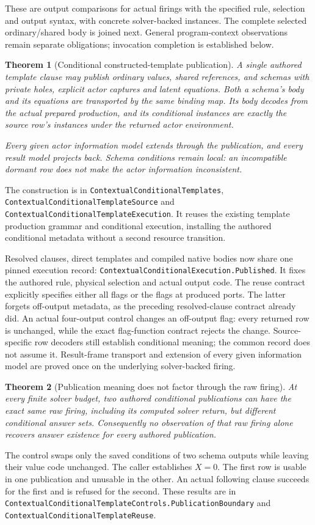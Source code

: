 \documentclass[11pt]{article}
\newtheorem{theorem}{Theorem}
\newcommand{\code}[1]{\texttt{\small #1}}
\begin{document}
These are output comparisons for actual firings with the specified rule,
selection and output syntax, with concrete solver-backed instances.
The complete selected ordinary/shared body is joined next. General
program-context observations remain separate obligations; invocation
completion is established below.

\begin{theorem}[Conditional constructed-template publication]
A single authored template clause may publish ordinary values, shared
references, and schemas with private holes, explicit actor captures and
latent equations. Both a schema's body and its equations are transported
by the same binding map. Its body decodes from the actual prepared
production, and its conditional instances are exactly the source row's
instances under the returned actor environment.

Every given actor information model extends through the publication, and
every result model projects back. Schema conditions remain local: an
incompatible dormant row does not make the actor information inconsistent.
\end{theorem}
The construction is in \code{ContextualConditionalTemplates},
\code{ContextualConditionalTemplateSource} and
\code{ContextualConditionalTemplateExecution}. It reuses the existing
template production grammar and conditional execution, installing the
authored conditional metadata without a second resource transition.

Resolved clauses, direct templates and compiled native bodies now share
one pinned execution record:
\code{ContextualConditionalExecution.Published}.
It fixes the authored rule, physical selection and actual output code.
The reuse contract explicitly specifies either all flags or the flags at
produced ports. The latter forgets off-output metadata, as the preceding
resolved-clause contract already did. An actual four-output control changes
an off-output flag: every returned row is unchanged, while the exact
flag-function contract rejects the change. Source-specific row decoders
still establish conditional meaning; the common record does not assume it.
Result-frame transport and extension of every given information model are
proved once on the underlying solver-backed firing.

\begin{theorem}[Publication meaning does not factor through the raw firing]
At every finite solver budget, two authored conditional publications can
have the exact same raw firing, including its computed solver return, but
different conditional answer sets. Consequently no observation of that
raw firing alone recovers answer existence for every authored publication.
\end{theorem}
The control swaps only the saved conditions of two schema outputs while
leaving their value code unchanged. The caller establishes $X=0$. The first
row is usable in one publication and unusable in the other. An actual
following clause succeeds for the first and is refused for the second.
These results are in
\code{ContextualConditionalTemplateControls.PublicationBoundary}
and \code{ContextualConditionalTemplateReuse}.
\end{document}
